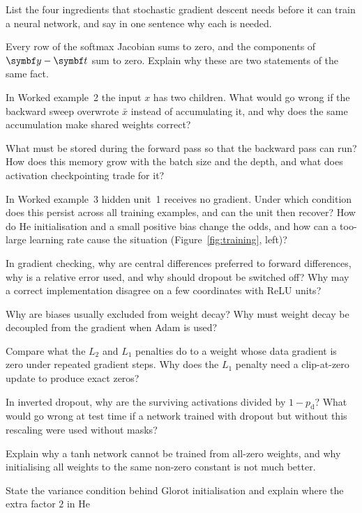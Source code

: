 \documentclass[11pt]{article}
\newcommand{\yv}{\vect{y}}
\newcommand{\tvec}{\vect{t}}
\begin{document}
\begin{questions}
\begin{conceptual}
\item List the four ingredients that stochastic gradient descent needs before it can train a neural network, and say in
  one sentence why each is needed.
\item Every row of the softmax Jacobian sums to zero, and the components of $\yv - \tvec$ sum to zero. Explain why these
  are two statements of the same fact.
\item In Worked example~2 the input $x$ has two children. What would go wrong if the backward sweep overwrote $\bar{x}$
  instead of accumulating it, and why does the same accumulation make shared weights correct?
\item What must be stored during the forward pass so that the backward pass can run? How does this memory grow with the
  batch size and the depth, and what does activation checkpointing trade for it?
\item In Worked example~3 hidden unit~1 receives no gradient. Under which condition does this persist across all
  training examples, and can the unit then recover? How do He initialisation and a small positive bias change the odds,
  and how can a too-large learning rate cause the situation (Figure~\ref{fig:training}, left)?
\item In gradient checking, why are central differences preferred to forward differences, why is a relative error used,
  and why should dropout be switched off? Why may a correct implementation disagree on a few coordinates with ReLU units?
\item Why are biases usually excluded from weight decay? Why must weight decay be decoupled from the gradient when Adam is
  used?
\item Compare what the $L_2$ and $L_1$ penalties do to a weight whose data gradient is zero under repeated gradient
  steps. Why does the $L_1$ penalty need a clip-at-zero update to produce exact zeros?
\item In inverted dropout, why are the surviving activations divided by $1 - p_{\mathrm{d}}$? What would go wrong at test
  time if a network trained with dropout but without this rescaling were used without masks?
\item Explain why a tanh network cannot be trained from all-zero weights, and why initialising all weights to the same
  non-zero constant is not much better.
\item State the variance condition behind Glorot initialisation and explain where the extra factor $2$ in He

\end{conceptual}
\end{questions}
\end{document}
